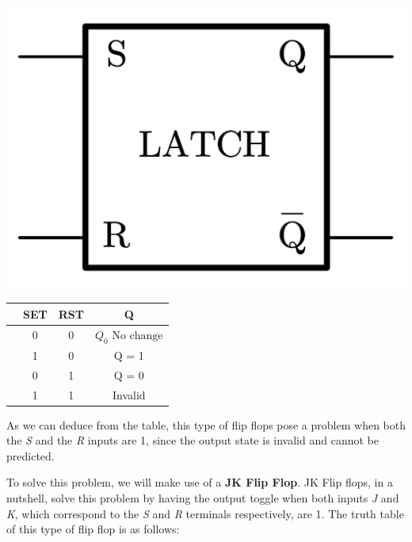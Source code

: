 \begin{minipage}{\textwidth}
    \begin{minipage}[b]{0.49\textwidth}
        \centering
        \includegraphics[scale=0.2]{Graphics/Practice 2/GRAPHICS/LOGIC GATES/SR ASYNCH.pdf}
        \label{fig:SR_Asynch}
    \end{minipage}
    \hfill
    \begin{minipage}[b]{0.49\textwidth}
        \centering
             \begin{tabular}[t]{lccc}
                \toprule
                &\textbf{SET}&\textbf{RST}&\textbf{Q}\\
                \midrule
                & 0 & 0 & $Q_0 \text{ No change}$\\
                & 1 & 0 & Q = 1\\
                & 0 & 1 & Q = 0\\
                & 1 & 1 & Invalid\\
                \bottomrule
            \end{tabular}
    \end{minipage}
\end{minipage}\textbf{}

\clearpage

As we can deduce from the table, this type of flip flops pose a problem when both the \textit{S} and the \textit{R} inputs are 1, since the output state is invalid and cannot be predicted.\medskip

To solve this problem, we will make use of a \textbf{JK Flip Flop}. JK Flip flops, in a nutshell, solve this problem by having the output toggle when both inputs \textit{J} and \textit{K}, which correspond to the \textit{S} and \textit{R} terminals respectively, are 1. The truth table of this type of flip flop is as follows:\bigskip

